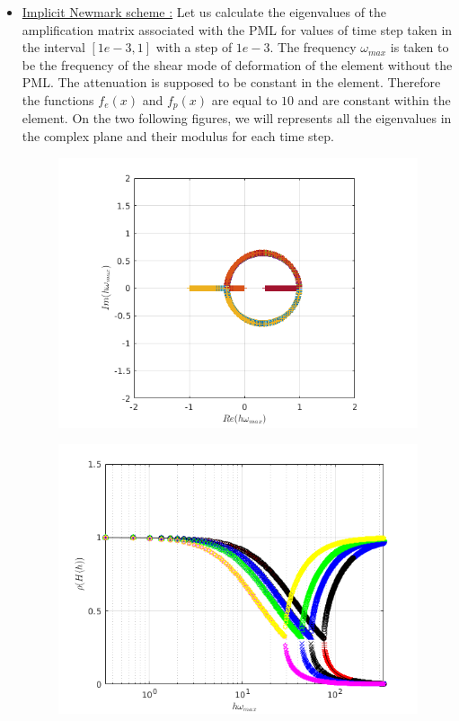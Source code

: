 \begin{itemize}
\item \underline{Implicit Newmark scheme :} Let us calculate the eigenvalues of the amplification matrix associated with the PML for values of time step taken in the interval $[1e-3, 1] $ with a step of $1e-3$. The frequency $\omega_{max}$ is taken to be the frequency of the shear mode of deformation of the element without the PML.
The attenuation is supposed to be constant in the element. Therefore the functions $f_e(x)$ and $f_p(x)$ are equal to $10$ and are constant within the element.
On the two following figures, we will represents all the eigenvalues in the complex plane and their modulus for each time step. 
\begin{figure}[H]
\centering
\begin{minipage}{.5\textwidth}
  \centering
  \includegraphics[width=1.\linewidth]{images/eig_pml_imp_10.png}
  \label{fig:eig_pml_imp_10}
\end{minipage}%
\begin{minipage}{.5\textwidth}
  \centering
  \includegraphics[width=1.\linewidth]{images/spect_rad_pml_imp_10.png}

\end{minipage}
\end{figure}
\end{itemize}
